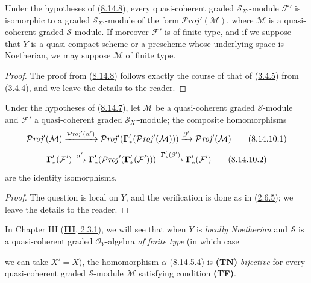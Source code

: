 \begin{corollary}[8.14.9]
\label{II.8.14.9}
Under the hypotheses of \textup{(\hyperref[II.8.14.8]{8.14.8})}, every
quasi-coherent graded $\mathcal{S}_{X'}$-module $\mathcal{F}'$ is isomorphic
to a graded $\mathcal{S}_{X'}$-module of the form
$\mathcal{P}\mathit{roj}'(\mathcal{M})$, where $\mathcal{M}$ is a
quasi-coherent graded $\mathcal{S}$-module. If moreover $\mathcal{F}'$ is of
finite type, and if we suppose that $Y$ is a quasi-compact scheme or a
prescheme whose underlying space is Noetherian, we may suppose
$\mathcal{M}$ of finite type.
\end{corollary}

\begin{proof}
The proof from (\hyperref[II.8.14.8]{8.14.8}) follows
exactly the course of that of (\hyperref[II.3.4.5]{3.4.5}) from
(\hyperref[II.3.4.4]{3.4.4}), and we leave the details to the reader.
\end{proof}

\begin{proposition}[8.14.10]
\label{II.8.14.10}
Under the hypotheses of \textup{(\hyperref[II.8.14.7]{8.14.7})}, let
$\mathcal{M}$ be a quasi-coherent graded $\mathcal{S}$-module and
$\mathcal{F}'$ a quasi-coherent graded $\mathcal{S}_{X'}$-module; the
composite homomorphisms
\begin{equation}
\label{II.8.14.10.1}
  \mathcal{P}\mathit{roj}'(\mathcal{M})
  \xrightarrow{\mathcal{P}\mathit{roj}'(\alpha')}
  \mathcal{P}\mathit{roj}'(\boldsymbol{\Gamma}'_*(\mathcal{P}\mathit{roj}'(\mathcal{M})))
  \xrightarrow{\beta'}\mathcal{P}\mathit{roj}'(\mathcal{M})
\tag{8.14.10.1}
\end{equation}
\begin{equation}
\label{II.8.14.10.2}
  \boldsymbol{\Gamma}'_*(\mathcal{F}')
  \xrightarrow{\alpha'}
  \boldsymbol{\Gamma}'_*(\mathcal{P}\mathit{roj}'(\boldsymbol{\Gamma}'_*(\mathcal{F}')))
  \xrightarrow{\boldsymbol{\Gamma}'_*(\beta')}\boldsymbol{\Gamma}'_*(\mathcal{F}')
\tag{8.14.10.2}
\end{equation}
are the identity isomorphisms.
\end{proposition}

\begin{proof}
The question is local on $Y$, and the verification is done as in
(\hyperref[II.2.6.5]{2.6.5}); we leave the details to the reader.
\end{proof}

\begin{remark}[8.14.11]
\label{II.8.14.11}
In Chapter III (\hyperref[III.2.3.1]{\textbf{III}, 2.3.1}), we will see that
when $Y$ is \emph{locally Noetherian} and $\mathcal{S}$ is a
quasi-coherent graded $\mathcal{O}_Y$-algebra \emph{of finite type} (in which
case

we can take $X'=X$), the homomorphism $\alpha$
(\hyperref[II.8.14.5.4]{8.14.5.4}) is \textbf{(TN)}-\emph{bijective} for
every quasi-coherent graded $\mathcal{S}$-module $\mathcal{M}$ satisfying
condition \textbf{(TF)}.
\end{remark}


